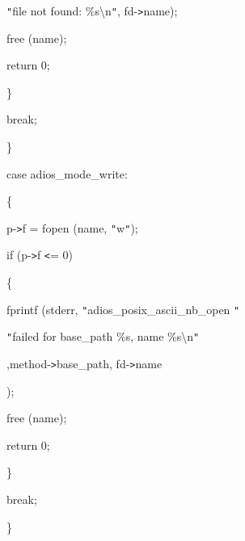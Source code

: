 \vspace{10pt}
\parindent=118pt
\texttt{"}file not found: \%s\textbackslash{}n\texttt{"}, fd-\texttt{>}name);

\vspace{10pt}
\parindent=57pt
free (name);

\vspace{10pt}
return 0;

\vspace{10pt}
\parindent=100pt
\}

\vspace{10pt}
\parindent=43pt
break;

\vspace{10pt}
\parindent=28pt
\}

\vspace{10pt}
case adios\_mode\_write:

\vspace{10pt}
\parindent=57pt
\{

\vspace{10pt}
\parindent=43pt
p-\texttt{>}f = fopen (name, \texttt{"}w\texttt{"});

\vspace{10pt}
if (p-\texttt{>}f \texttt{<}= 0)

\vspace{10pt}
\parindent=86pt
\{

\vspace{10pt}
\parindent=57pt
fprintf (stderr, \texttt{"}adios\_posix\_ascii\_nb\_open \texttt{"}

\vspace{10pt}
\parindent=111pt
\texttt{"}failed for base\_path \%s, name \%s\textbackslash{}n\texttt{"}

\vspace{10pt}
\parindent=0pt
,method-\texttt{>}base\_path, fd-\texttt{>}name

\vspace{10pt}
);

\vspace{10pt}
\parindent=57pt
free (name);

\vspace{10pt}
return 0;

\vspace{10pt}
\parindent=100pt
\}

\vspace{10pt}
\parindent=43pt
break;

\vspace{10pt}
\parindent=28pt
\} 

